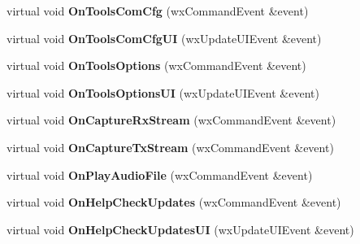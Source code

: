\begin{DoxyCompactItemize}
\item 
\hypertarget{class_top_frame_a4da08864997b39e455cb27baf149158e}{virtual void {\bfseries On\-Tools\-Com\-Cfg} (wx\-Command\-Event \&event)}\label{class_top_frame_a4da08864997b39e455cb27baf149158e}

\item 
\hypertarget{class_top_frame_ae6a2fcaea9f637a07c268966e3701a7f}{virtual void {\bfseries On\-Tools\-Com\-Cfg\-U\-I} (wx\-Update\-U\-I\-Event \&event)}\label{class_top_frame_ae6a2fcaea9f637a07c268966e3701a7f}

\item 
\hypertarget{class_top_frame_ad5868b1c2fde8ca783406adc8ef0265e}{virtual void {\bfseries On\-Tools\-Options} (wx\-Command\-Event \&event)}\label{class_top_frame_ad5868b1c2fde8ca783406adc8ef0265e}

\item 
\hypertarget{class_top_frame_a8e2097cede4251a0af1b514644e2af7d}{virtual void {\bfseries On\-Tools\-Options\-U\-I} (wx\-Update\-U\-I\-Event \&event)}\label{class_top_frame_a8e2097cede4251a0af1b514644e2af7d}

\item 
\hypertarget{class_top_frame_a9df4550ab45099f529c0c590494711f1}{virtual void {\bfseries On\-Capture\-Rx\-Stream} (wx\-Command\-Event \&event)}\label{class_top_frame_a9df4550ab45099f529c0c590494711f1}

\item 
\hypertarget{class_top_frame_a62ff15f1e41b0f427dd38eb5141ff28f}{virtual void {\bfseries On\-Capture\-Tx\-Stream} (wx\-Command\-Event \&event)}\label{class_top_frame_a62ff15f1e41b0f427dd38eb5141ff28f}

\item 
\hypertarget{class_top_frame_a6d4b2952ca287bc60f8c4086b0a5e61c}{virtual void {\bfseries On\-Play\-Audio\-File} (wx\-Command\-Event \&event)}\label{class_top_frame_a6d4b2952ca287bc60f8c4086b0a5e61c}

\item 
\hypertarget{class_top_frame_a942a998d831614a31f69b9d91aacff33}{virtual void {\bfseries On\-Help\-Check\-Updates} (wx\-Command\-Event \&event)}\label{class_top_frame_a942a998d831614a31f69b9d91aacff33}

\item 
\hypertarget{class_top_frame_a9512f3c04c2e9ab2c47f84141547fd1d}{virtual void {\bfseries On\-Help\-Check\-Updates\-U\-I} (wx\-Update\-U\-I\-Event \&event)}\label{class_top_frame_a9512f3c04c2e9ab2c47f84141547fd1d}


\end{DoxyCompactItemize}
